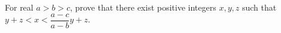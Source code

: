 For real $a>b>c$, prove that there exist positive integers $x,y,z$ such that $y+z<x<\dfrac{a-c}{a-b}y+z$.
